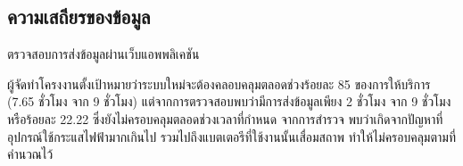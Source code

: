 \subsection{ความเสถียรของข้อมูล}

ตรวจสอบการส่งข้อมูลผ่านเว็บแอพพลิเคชัน

ผู้จัดทำโครงงานตั้งเป้าหมายว่าระบบใหม่จะต้องคลอบคลุมตลอดช่วงร้อยละ 85 ของการให้บริการ (7.65 ชั่วโมง จาก 9 ชั่วโมง) แต่จากการตรวจสอบพบว่ามีการส่งข้อมูลเพียง 2 ชั่วโมง จาก 9 ชั่วโมง หรือร้อยละ 22.22 ซึ่งยังไม่ครอบคลุมตลอดช่วงเวลาที่กำหนด จากการสำรวจ พบว่าเกิดจากปัญหาที่อุปกรณ์ใช้กระแสไฟฟ้ามากเกินไป รวมไปถึงแบตเตอรีที่ใช้งานนั้นเสื่อมสถาพ ทำให้ไม่ครอบคลุมตามที่คำนวณไว้
